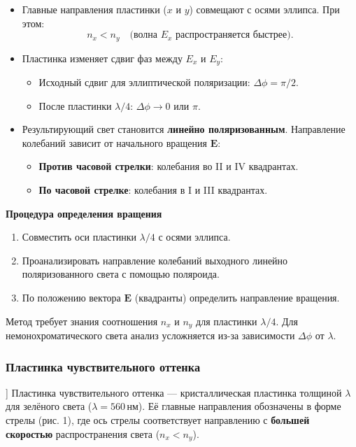 \begin{itemize}
    \item Главные направления пластинки (\( x \) и \( y \)) совмещают с осями эллипса. При этом:
    \begin{equation}
        n_x < n_y \quad \text{(волна } E_x \text{ распространяется быстрее)}.
    \end{equation}
    
    \item Пластинка изменяет сдвиг фаз между \( E_x \) и \( E_y \):
    \begin{itemize}
        \item Исходный сдвиг для эллиптической поляризации: \( \Delta\phi = \pi/2 \).
        \item После пластинки \( \lambda/4 \): \( \Delta\phi \rightarrow 0 \) или \( \pi \).
    \end{itemize}
    
    \item Результирующий свет становится \textbf{линейно поляризованным}. Направление колебаний зависит от начального вращения \( \mathbf{E} \):
    \begin{itemize}
        \item \textbf{Против часовой стрелки}: колебания во II и IV квадрантах.
        \item \textbf{По часовой стрелке}: колебания в I и III квадрантах.
    \end{itemize}
\end{itemize}

\textbf{Процедура определения вращения}

\begin{enumerate}
    \item Совместить оси пластинки \( \lambda/4 \) с осями эллипса.
    \item Проанализировать направление колебаний выходного линейно поляризованного света с помощью поляроида.
    \item По положению вектора \( \mathbf{E} \) (квадранты) определить направление вращения.
\end{enumerate}

Метод требует знания соотношения \( n_x \) и \( n_y \) для пластинки \( \lambda/4 \). Для немонохроматического света анализ усложняется из-за зависимости \( \Delta\phi \) от \( \lambda \).

\subsubsection{Пластинка чувствительного оттенка}]
Пластинка чувствительного оттенка — кристаллическая пластинка толщиной $\lambda$ для зелёного света ($\lambda = 560 \, \text{нм}$). Её главные направления обозначены в форме стрелы (рис. 1), где ось стрелы соответствует направлению с \textbf{большей скоростью} распространения света ($n_x < n_y$).

